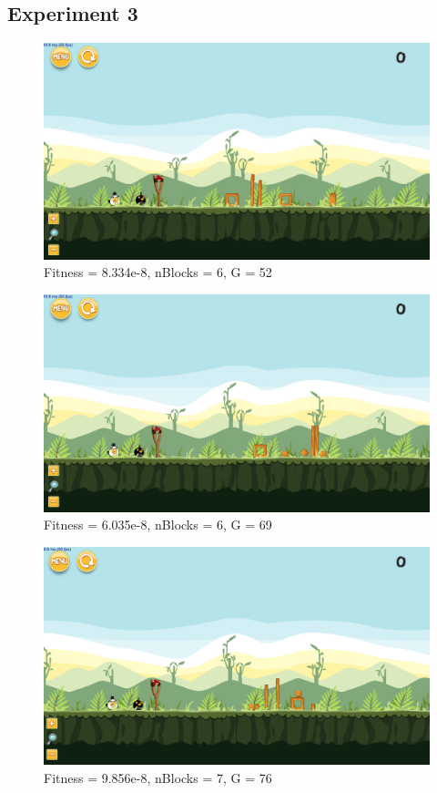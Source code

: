 \subsection{Experiment 3}\label{a:e3}
\begin{figure}[H]
	\centering
	\includegraphics[scale=0.35]{gfx/e3/level-0-second_crossover180613_010758.png}
	\caption{Fitness = 8.334e-8, nBlocks = 6, G = 52 }\label{f:e3-1}
\end{figure}

\begin{figure}[H]
	\centering
	\includegraphics[scale=0.35]{gfx/e3/level-0-second_crossover180613_024124.png}
	\caption{Fitness = 6.035e-8, nBlocks = 6, G = 69 }\label{f:e3-2}
\end{figure}

\begin{figure}[H]
	\centering
	\includegraphics[scale=0.35]{gfx/e3/level-0-second_crossover180613_041716.png}
	\caption{Fitness = 9.856e-8, nBlocks = 7, G = 76 }\label{f:e3-3}
\end{figure}

